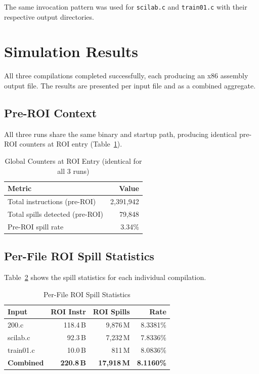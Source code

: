 \documentclass[conference]{IEEEtran}
\begin{document}
The same invocation pattern was used for \texttt{scilab.c} and
\texttt{train01.c} with their respective output directories.

\section{Simulation Results}

All three compilations completed successfully, each producing an
x86 assembly output file. The results are presented per input file
and as a combined aggregate.

\subsection{Pre-ROI Context}

All three runs share the same binary and startup path, producing
identical pre-ROI counters at ROI entry (Table~\ref{tab:preroi}).

\begin{table}[H]
\centering
\caption{Global Counters at ROI Entry (identical for all 3 runs)}
\label{tab:preroi}
\begin{tabular}{lr}
\toprule
\textbf{Metric} & \textbf{Value} \\
\midrule
Total instructions (pre-ROI) & 2,391,942 \\
Total spills detected (pre-ROI) & 79,848 \\
Pre-ROI spill rate & 3.34\% \\
\bottomrule
\end{tabular}
\end{table}

\subsection{Per-File ROI Spill Statistics}

Table~\ref{tab:perfile} shows the spill statistics for each
individual compilation.

\begin{table}[H]
\centering
\caption{Per-File ROI Spill Statistics}
\label{tab:perfile}
\begin{tabular}{lrrr}
\toprule
\textbf{Input} & \textbf{ROI Instr} & \textbf{ROI Spills} & \textbf{Rate} \\
\midrule
200.c     & 118.4\,B & 9,876\,M & 8.3381\% \\
scilab.c  &  92.3\,B & 7,232\,M & 7.8336\% \\
train01.c &  10.0\,B &   811\,M & 8.0836\% \\
\midrule
\textbf{Combined} & \textbf{220.8\,B} & \textbf{17,918\,M} & \textbf{8.1160\%} \\
\bottomrule
\end{tabular}
\end{table}
\end{document}

